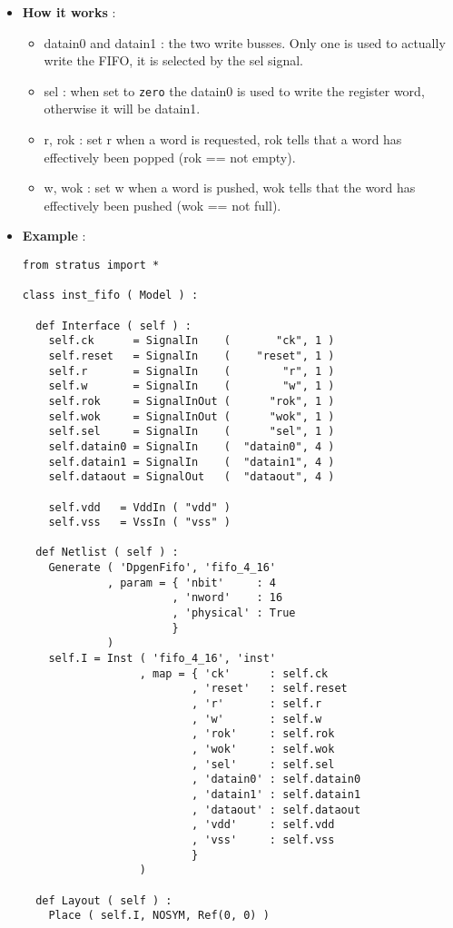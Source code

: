 \begin{itemize}
\begin{itemize}
    \end{itemize}
    \item \textbf{How it works} :
    \begin{itemize}
        \item datain0 and datain1 : the two write busses. Only one is used to actually write the FIFO, it is selected by the sel signal.
        \item sel : when set to \verb-zero- the datain0 is used to write the register word, otherwise it will be datain1.
        \item r, rok : set r when a word is requested, rok tells that a word has effectively been popped (rok == not empty).
        \item w, wok : set w when a word is pushed, wok tells that the word has effectively been pushed (wok == not full).
    \end{itemize}    
    \item \textbf{Example} :
\begin{verbatim}
from stratus import *

class inst_fifo ( Model ) :

  def Interface ( self ) :
    self.ck      = SignalIn    (       "ck", 1 )
    self.reset   = SignalIn    (    "reset", 1 )
    self.r       = SignalIn    (        "r", 1 )
    self.w       = SignalIn    (        "w", 1 )
    self.rok     = SignalInOut (      "rok", 1 )
    self.wok     = SignalInOut (      "wok", 1 )
    self.sel     = SignalIn    (      "sel", 1 )
    self.datain0 = SignalIn    (  "datain0", 4 )
    self.datain1 = SignalIn    (  "datain1", 4 )
    self.dataout = SignalOut   (  "dataout", 4 ) 
    
    self.vdd   = VddIn ( "vdd" )
    self.vss   = VssIn ( "vss" )
    
  def Netlist ( self ) :
    Generate ( 'DpgenFifo', 'fifo_4_16'
             , param = { 'nbit'     : 4
                       , 'nword'    : 16
                       , 'physical' : True
                       }
             )      
    self.I = Inst ( 'fifo_4_16', 'inst'
                  , map = { 'ck'      : self.ck
                          , 'reset'   : self.reset
                          , 'r'       : self.r
                          , 'w'       : self.w
                          , 'rok'     : self.rok
                          , 'wok'     : self.wok
                          , 'sel'     : self.sel
                          , 'datain0' : self.datain0
                          , 'datain1' : self.datain1
                          , 'dataout' : self.dataout
                          , 'vdd'     : self.vdd
                          , 'vss'     : self.vss
                          }
                  )
    
  def Layout ( self ) :
    Place ( self.I, NOSYM, Ref(0, 0) )
\end{verbatim}
\end{itemize}
